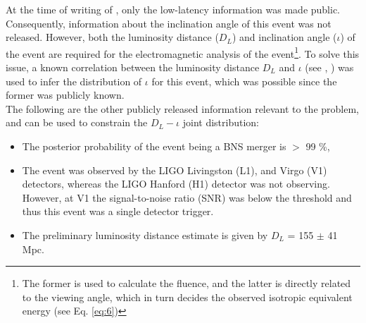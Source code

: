     At the time of writing of \cite{saleem_2020B}, only the low-latency information was
    made public. Consequently, information about the inclination angle of this event was
    not released. However, both the luminosity distance ($D_L$) and inclination angle
    ($\iota$) of the event are required for the electromagnetic analysis of the
    event\footnote{
        The former is used to calculate the fluence, and the latter is directly related
        to the viewing angle, which in turn decides the observed isotropic equivalent
        energy (see Eq. \ref{eq:6})
    }. To solve this issue, a known correlation between the luminosity distance $D_L$
    and $\iota$ (see \cite{schutz_2011}, \cite{seto_2015}) was used to infer the
    distribution of $\iota$ for this event, which was possible since the former was
    publicly known.\\
    The following are the other publicly released information relevant to the problem,
    and can be used to constrain the $D_L-\iota$ joint distribution:
    \begin{itemize}

        \item The posterior probability of the event being a BNS merger is $>$ 99 \%,

        \item The event was observed by the LIGO Livingston (L1), and Virgo (V1)
            detectors, whereas the LIGO Hanford (H1) detector was not observing.
            However, at V1 the signal-to-noise ratio (SNR) was below the threshold and
            thus this event was a single detector trigger.

        \item The preliminary luminosity distance estimate is given by $D_L$ = 155 $\pm$
            41 Mpc.

    \end{itemize}

